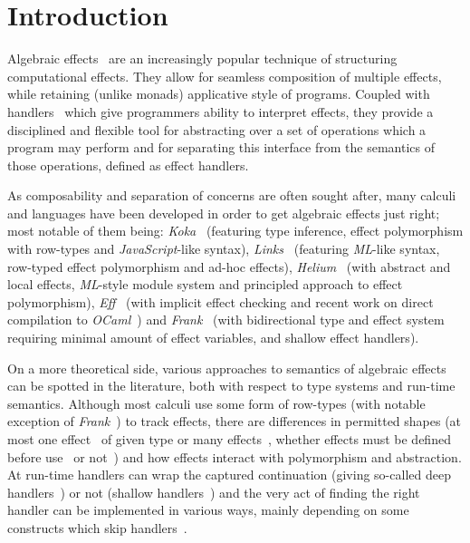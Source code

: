 \documentclass[inz, english, longabstract]{iithesis}
\author         {Maciej Buszka}
\begin{document}
%
\chapter{Introduction}
% 
%
%
%
Algebraic effects~\cite{Plotkin2003} are an increasingly popular technique of structuring computational effects.
They allow for seamless composition of multiple effects, while retaining (unlike monads) applicative style of programs.
Coupled with handlers~\cite{Plotkin2013} which give programmers ability to interpret effects, they provide a disciplined and flexible tool for abstracting over a set of operations which a program may perform and for separating this interface from the semantics of those operations, defined as effect handlers.

As composability and separation of concerns are often sought after, many calculi and languages have been developed in order to get algebraic effects just right; most notable of them being: \emph{Koka}~\cite{Leijen2014} (featuring type inference, effect polymorphism with row-types and \emph{JavaScript}-like syntax), \emph{Links}~\cite{Hillerstrom2016} (featuring \emph{ML}-like syntax, row-typed effect polymorphism and ad-hoc effects), \emph{Helium}~\cite{Biernacki2019} (with abstract and local effects, \emph{ML}-style module system and principled approach to effect polymorphism), \emph{Eff}~\cite{Bauer2012} (with implicit effect checking and recent work on direct compilation to \emph{OCaml}~\cite{Kiselyov2018}) and \emph{Frank}~\cite{Lindley2017} (with bidirectional type and effect system requiring minimal amount of effect variables, and shallow effect handlers). 

On a more theoretical side, various approaches to semantics of algebraic effects can be spotted in the literature, both with respect to type systems and run-time semantics.
Although most calculi use some form of row-types (with notable exception of \emph{Frank}~\cite{Lindley2017}) to track effects, there are differences in permitted shapes (at most one effect~\cite{Hillerstrom2016} of given type or many effects~\cite{Biernacki2017,Leijen2014}, whether effects must be defined before use~\cite{Biernacki2017,Lindley2017,Leijen2014,Bauer2012} or not~\cite{Hillerstrom2016}) and how effects interact with polymorphism and abstraction.
At run-time handlers can wrap the captured continuation (giving so-called deep handlers~\cite{Biernacki2017,Hillerstrom2016,Leijen2014,Bauer2012}) or not (shallow handlers~\cite{Lindley2017}) and the very act of finding the right handler can be implemented in various ways, mainly depending on some constructs which skip handlers~\cite{Biernacki2017}. 
\end{document}
